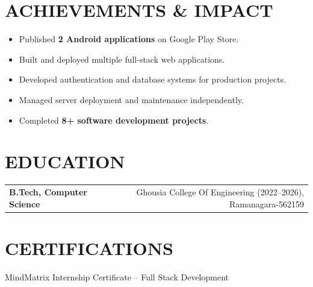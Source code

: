 \documentclass[10pt,a4paper]{article}
\begin{document}
\section*{ACHIEVEMENTS \& IMPACT}

\begin{itemize}
\item Published \textbf{2 Android applications} on Google Play Store.
\item Built and deployed multiple full-stack web applications.
\item Developed authentication and database systems for production projects.
\item Managed server deployment and maintenance independently.
\item Completed \textbf{8+ software development projects}.
\end{itemize}



\section*{EDUCATION}

\begin{tabularx}{\textwidth}{Xr}
\textbf{B.Tech, Computer Science}
&
Ghousia College Of Engineering (2022--2026), Ramanagara-562159
\end{tabularx}


\section*{CERTIFICATIONS}

MindMatrix Internship Certificate -- Full Stack Development
\end{document}
